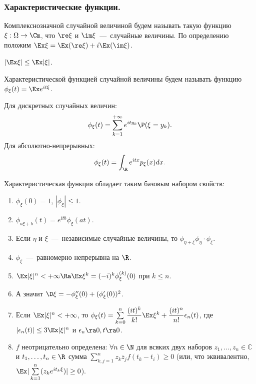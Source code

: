\subsubsection{Характеристические функции.}
\begin{definition}
    Комплекснозначной случайной величиной будем называть такую функцию $\xi: \Omega \to \Cm$, что $\re \xi$ и $\im \xi$~---~случайные величины.
    По определению положим $\Ex \xi = \Ex(\re \xi) + i\Ex(\im \xi)$.
\end{definition}
\begin{proposition}
    $|\Ex \xi| \leq \Ex |\xi|$.
\end{proposition}
\begin{definition}
    Характеристической функцией случайной величины будем называть функцию $\phi_\xi(t) = \Ex e^{it\xi}$.
\end{definition}
\begin{note}
    Для дискретных случайных величин:
    \[
        \phi_{\xi}(t) = \sum\limits_{k = 1}^{+\infty} e^{ity_k}\P(\xi = y_k).
    \]
    Для абсолютно-непрерывных:
    \[
        \phi_{\xi}(t) = \int_{\R} e^{itx}p_{\xi}(x)dx.
    \]
\end{note}
\begin{proposition}
    Характеристическая функция обладает таким базовым набором свойств:
    \begin{enumerate}
        \item $\phi_\xi(0) = 1$, $|\phi_\xi| \leq 1$.
        \item $\phi_{a \xi + b}(t) = e^{itb}\phi_\xi (at)$.
        \item Если $\eta$ и $\xi$~---~независимые случайные величины, то $\phi_{\eta + \xi} \phi_\eta \cdot \phi_\xi$.
        \item $\phi_\xi$~---~равномерно непрерывна на $\R$.
        \item $\Ex |\xi|^n < +\infty \Ra \Ex \xi^k = (-i)^k \phi_\xi^{(k)}(0)$ при $k \leq n$.
        \item А значит $\D \xi = -\phi_\xi''(0) + (\phi_\xi'(0))^2$.
        \item Если $\Ex |\xi|^n < +\infty$, то $\phi_\xi(t) = \sum\limits_{k = 0}^n \dfrac{(it)^k}{k!}\Ex \xi^k + \dfrac{(it)^n}{n!}\epsilon_n(t)$, где $|\epsilon_n(t)| \leq 3\Ex|\xi|^n$ и $\epsilon_n \ra 0, t \ra 0$.
        \item $f$ неотрицательно определена: $\forall n \in \N$ для всяких двух наборов $z_1, \ldots, z_n \in \mathbb{C}$ и $t_1, \ldots, t_n \in \R$ сумма $\sum\limits_{k, j = 1}^{n} z_k \overline{z}_{j}f(t_k - t_i) \geq 0$ (или, что эквивалентно, $\Ex |\sum\limits_{k = 1}^n (z_ke^{it_k \xi})| \geq 0$).
    \end{enumerate}
\end{proposition}
